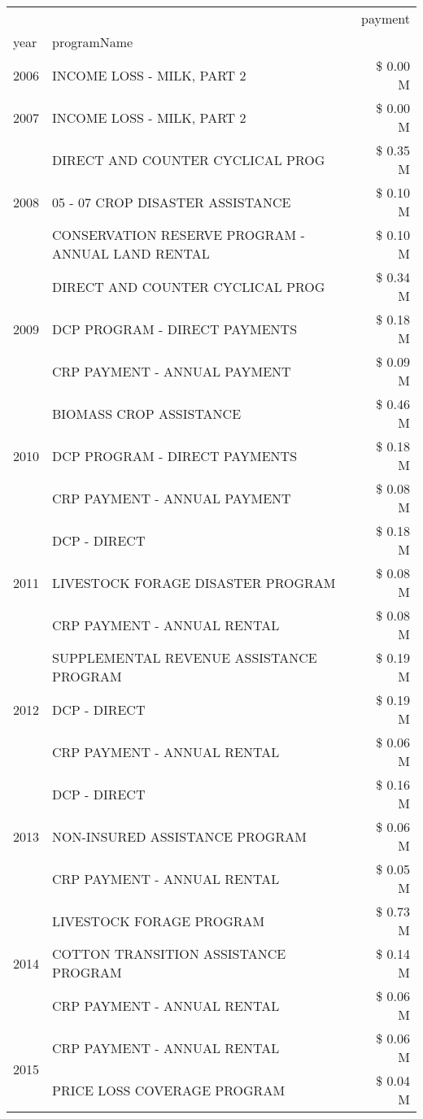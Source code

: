 \begin{tabular}{llr}
\toprule
 &  & payment \\
year & programName &  \\
\midrule
2006 & INCOME LOSS - MILK, PART 2 & \$ 0.00 M \\
\cline{1-3}
2007 & INCOME LOSS - MILK, PART 2 & \$ 0.00 M \\
\cline{1-3}
\multirow[t]{3}{*}{2008} & DIRECT AND COUNTER CYCLICAL PROG & \$ 0.35 M \\
 & 05 - 07 CROP DISASTER ASSISTANCE & \$ 0.10 M \\
 & CONSERVATION RESERVE PROGRAM - ANNUAL LAND RENTAL & \$ 0.10 M \\
\cline{1-3}
\multirow[t]{3}{*}{2009} & DIRECT AND COUNTER CYCLICAL PROG & \$ 0.34 M \\
 & DCP PROGRAM - DIRECT PAYMENTS & \$ 0.18 M \\
 & CRP PAYMENT - ANNUAL PAYMENT & \$ 0.09 M \\
\cline{1-3}
\multirow[t]{3}{*}{2010} & BIOMASS CROP ASSISTANCE & \$ 0.46 M \\
 & DCP PROGRAM - DIRECT PAYMENTS & \$ 0.18 M \\
 & CRP PAYMENT - ANNUAL PAYMENT & \$ 0.08 M \\
\cline{1-3}
\multirow[t]{3}{*}{2011} & DCP - DIRECT & \$ 0.18 M \\
 & LIVESTOCK FORAGE DISASTER PROGRAM & \$ 0.08 M \\
 & CRP PAYMENT - ANNUAL RENTAL & \$ 0.08 M \\
\cline{1-3}
\multirow[t]{3}{*}{2012} & SUPPLEMENTAL REVENUE ASSISTANCE PROGRAM & \$ 0.19 M \\
 & DCP - DIRECT & \$ 0.19 M \\
 & CRP PAYMENT - ANNUAL RENTAL & \$ 0.06 M \\
\cline{1-3}
\multirow[t]{3}{*}{2013} & DCP - DIRECT & \$ 0.16 M \\
 & NON-INSURED ASSISTANCE PROGRAM & \$ 0.06 M \\
 & CRP PAYMENT - ANNUAL RENTAL & \$ 0.05 M \\
\cline{1-3}
\multirow[t]{3}{*}{2014} & LIVESTOCK FORAGE PROGRAM & \$ 0.73 M \\
 & COTTON TRANSITION ASSISTANCE PROGRAM & \$ 0.14 M \\
 & CRP PAYMENT - ANNUAL RENTAL & \$ 0.06 M \\
\cline{1-3}
\multirow[t]{3}{*}{2015} & CRP PAYMENT - ANNUAL RENTAL & \$ 0.06 M \\
 & PRICE LOSS COVERAGE PROGRAM & \$ 0.04 M \\

\end{tabular}
